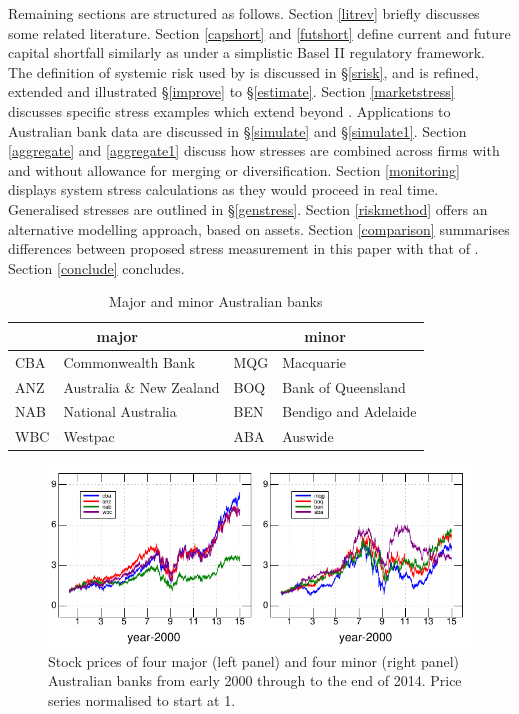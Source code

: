 \documentclass[12pt]{article}
\newcommand{\sref}[1]{\S\ref{#1}}
\begin{document}
Remaining sections are structured as follows. Section \ref{litrev} briefly discusses some related literature. Section \ref{capshort} and \ref{futshort} define current and future  capital shortfall similarly as \cite{brownlees2015} under a simplistic Basel II regulatory framework. The definition of systemic risk used by \cite{brownlees2015} is discussed in \sref{srisk}, and is refined, extended and illustrated \sref{improve} to \sref{estimate}. Section \ref{marketstress} discusses specific stress examples which extend beyond \cite{brownlees2015}. Applications to Australian bank data are discussed in \sref{simulate} and \sref{simulate1}. Section \ref{aggregate} and \ref{aggregate1} discuss how stresses are combined across firms with and without allowance for merging or diversification. Section \ref{monitoring} displays system stress calculations as they would proceed in real time. Generalised stresses are outlined in \sref{genstress}.  Section \ref{riskmethod} offers an alternative modelling approach, based on assets. Section \ref{comparison} summarises differences between proposed stress measurement in this paper with that of 
\cite{brownlees2015}. Section \ref{conclude} concludes.

\begin{table}[htdp]
\label{banks}\caption{Major and minor Australian banks}\label{eightbanks}
\begin{center}
\begin{tabular}{l|l||l|l}
\hline
 \multicolumn{2}{c||}{major}& \multicolumn{2}{c}{minor}\\
 \hline
CBA & Commonwealth Bank  & MQG & Macquarie \\
ANZ & Australia \& New Zealand  & BOQ & Bank of Queensland\\
NAB & National Australia  & BEN & Bendigo and Adelaide \\
WBC & Westpac & ABA& Auswide \\
\hline
\end{tabular}
\end{center}
\end{table}%


\begin{figure}[htbp]
\begin{center}
\includegraphics{figures/prices.pdf}
\caption{Stock  prices of four major (left panel) and four minor (right panel) Australian banks from early 2000 through to the end of 2014.  Price series normalised to start at 1.}
\label{prices}
\end{center}
\end{figure}
\end{document}
